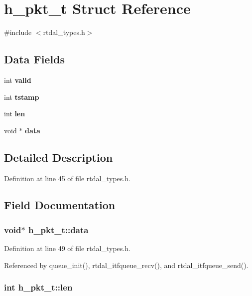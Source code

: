 \section{h\-\_\-pkt\-\_\-t Struct Reference}
\label{structh__pkt__t}


{\ttfamily \#include $<$rtdal\-\_\-types.\-h$>$}

\subsection*{Data Fields}
\begin{DoxyCompactItemize}
\item 
int {\bf valid}
\item 
int {\bf tstamp}
\item 
int {\bf len}
\item 
void $\ast$ {\bf data}
\end{DoxyCompactItemize}


\subsection{Detailed Description}


Definition at line 45 of file rtdal\-\_\-types.\-h.



\subsection{Field Documentation}
\subsubsection[{data}]{\setlength{\rightskip}{0pt plus 5cm}void$\ast$ h\-\_\-pkt\-\_\-t\-::data}\label{structh__pkt__t_a5ceb641f2021c23b179fc555e0268b32}


Definition at line 49 of file rtdal\-\_\-types.\-h.



Referenced by queue\-\_\-init(), rtdal\-\_\-itfqueue\-\_\-recv(), and rtdal\-\_\-itfqueue\-\_\-send().

\subsubsection[{len}]{\setlength{\rightskip}{0pt plus 5cm}int h\-\_\-pkt\-\_\-t\-::len}\label{structh__pkt__t_a0164b2387d8a25d88a0cf32423655bc1}


